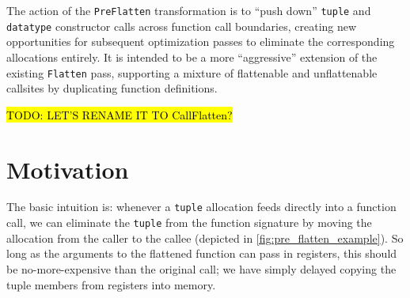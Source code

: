 The action of the \texttt{PreFlatten} transformation is to ``push
down'' \texttt{tuple} and \texttt{datatype} constructor calls across function
call boundaries, creating new opportunities for subsequent optimization passes
to eliminate the corresponding allocations entirely. It is intended to be a more
``aggressive'' extension of the existing \texttt{Flatten} pass, supporting a
mixture of flattenable and unflattenable callsites by duplicating function
definitions.





\hl{TODO: LET'S RENAME IT TO CallFlatten?}

\section{Motivation}
The basic intuition is: whenever a \texttt{tuple} allocation feeds directly into
a function call, we can eliminate the \texttt{tuple} from the function signature
by moving the allocation from the caller to the callee (depicted
in \cref{fig:pre_flatten_example}). So long as the arguments to the flattened
function can pass in registers, this should be no-more-expensive than the
original call; we have simply delayed copying the tuple members from registers
into memory.




